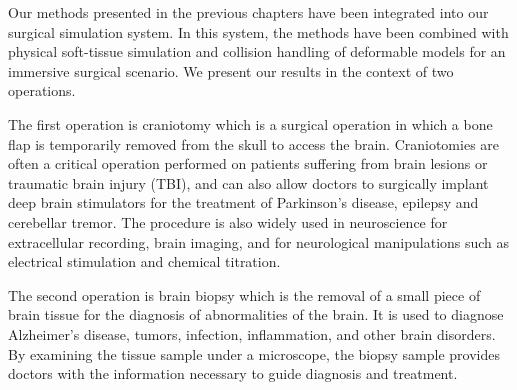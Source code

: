 \label{chapter:evaluation}
Our methods presented in the previous chapters have been integrated into our surgical simulation system. 
In this system, the methods have been combined with physical soft-tissue simulation and collision handling of deformable
models for an immersive surgical scenario. We present our results in the context of two operations.

The first operation is craniotomy which is a surgical operation in which a bone flap is temporarily removed from the skull to access the brain.
Craniotomies are often a critical operation performed on patients suffering from brain lesions or traumatic brain injury (TBI), and can also allow 
doctors to surgically implant deep brain stimulators for the treatment of Parkinson's disease, epilepsy and cerebellar tremor. The procedure is 
also widely used in neuroscience for extracellular recording, brain imaging, and for neurological manipulations such as electrical stimulation and 
chemical titration.

The second operation is brain biopsy which is the removal of a small piece of brain tissue for the diagnosis of abnormalities of the brain. It is used 
to diagnose Alzheimer's disease, tumors, infection, inflammation, and other brain disorders. By examining the tissue sample under a microscope, the 
biopsy sample provides doctors with the information necessary to guide diagnosis and treatment.